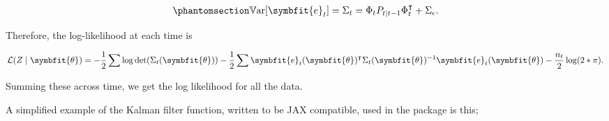 \documentclass[
]{report}
\newcommand{\bv}[1]{\symbfit{#1}}
\theoremstyle{plain}
\theoremstyle{plain}
\theoremstyle{remark}
\begin{document}
\begin{equation}\phantomsection\label{eq-predvar}{\begin{split}
\mathbb V\mathrm{ar}[\bv e_t]=\Sigma_t= \Phi_{t} P_{t\mid t-1} \Phi_{t}^\intercal + \Sigma_\epsilon. 
\end{split}
}\end{equation}

Therefore, the log-likelihood at each time is

\[\begin{split}
\mathcal L(Z\mid\bv\theta) = -\frac12\sum \log\det(\Sigma_t(\bv\theta)) - \frac12 \sum\bv e_t(\bv\theta)^\intercal\Sigma_{t}(\bv\theta)^{-1} \bv e_t(\bv\theta) - \frac{n_{t}}{2}\log(2*\pi).
\end{split}
\]

Summing these across time, we get the log likelihood for all the data.

A simplified example of the Kalman filter function, written to be JAX
compatible, used in the package is this;

\newpage
\small
\end{document}
